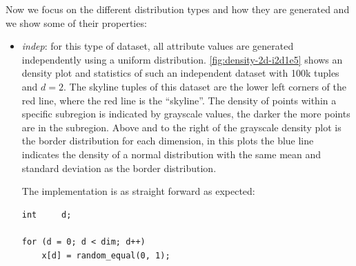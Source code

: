 \pagebreak[4]

Now we focus on the different distribution types and how they are
generated and we show some of their properties:

\begin{itemize}
\item \emph{indep}: 
for this type of dataset, all attribute values are generated
independently using a uniform distribution. 
\autoref{fig:density-2d-i2d1e5} shows an density plot
and statistics of such an independent dataset with 100k tuples and $d
= 2$. The skyline tuples of this dataset are the lower left corners of
the red line, where the red line is the ``skyline''. The density of
points within a specific subregion is indicated by grayscale values,
the darker the more points are in the subregion. Above and to the
right of the grayscale density plot is the border distribution for
each dimension, in this plots the blue line indicates the density of a
normal distribution with the same mean and standard deviation as the
border distribution.

The implementation is as straight forward as expected:

\begin{lstlisting}
int		d;

for (d = 0; d < dim; d++)
	x[d] = random_equal(0, 1);
\end{lstlisting}


\end{itemize}
